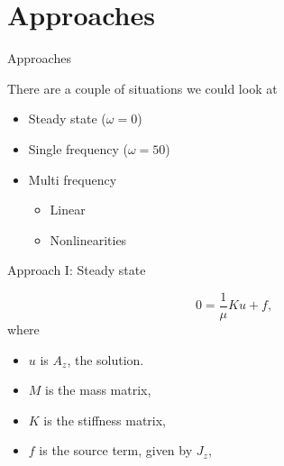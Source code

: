 \documentclass[aspectratio=43]{beamer}
\begin{document}
\section{Approaches}
\begin{frame}[fragile]{Approaches} %

There are a couple of situations we could look at
\begin{itemize}
    \item Steady state ($\omega = 0$)
    \item Single frequency ($\omega = 50$)
    \item Multi frequency
    \begin{itemize}
        \item Linear
        \item Nonlinearities
    \end{itemize}
\end{itemize}
\end{frame}



\begin{frame}[fragile]{Approach I: Steady state} %


\begin{discretization}
    \begin{equation*}
        0 = \frac{1}{\mu}K u + f,
    \end{equation*}
    where
    \begin{itemize}
        \item $u$ is $A_z$, the solution.
        \item $M$ is the mass matrix,
        \item $K$ is the stiffness matrix,
        \item $f$ is the source term, given by $J_z$,
    \end{itemize}
\end{discretization}
\end{frame}
\end{document}
